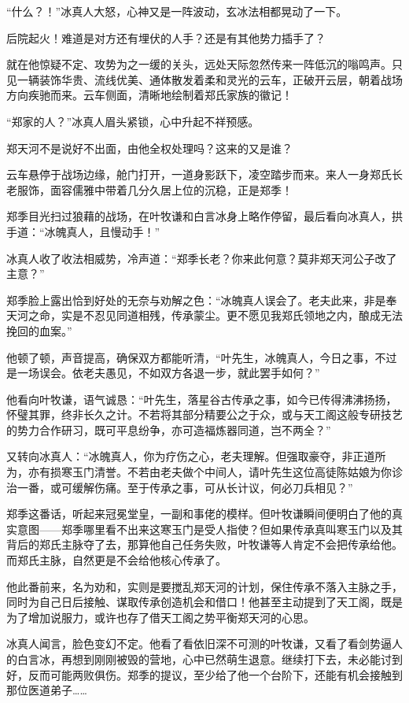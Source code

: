 “什么？！”冰真人大怒，心神又是一阵波动，玄冰法相都晃动了一下。

后院起火！难道是对方还有埋伏的人手？还是有其他势力插手了？

就在他惊疑不定、攻势为之一缓的关头，远处天际忽然传来一阵低沉的嗡鸣声。只见一辆装饰华贵、流线优美、通体散发着柔和灵光的云车，正破开云层，朝着战场方向疾驰而来。云车侧面，清晰地绘制着郑氏家族的徽记！

“郑家的人？”冰真人眉头紧锁，心中升起不祥预感。

郑天河不是说好不出面，由他全权处理吗？这来的又是谁？

云车悬停于战场边缘，舱门打开，一道身影跃下，凌空踏步而来。来人一身郑氏长老服饰，面容儒雅中带着几分久居上位的沉稳，正是郑季！

郑季目光扫过狼藉的战场，在叶牧谦和白言冰身上略作停留，最后看向冰真人，拱手道：“冰魄真人，且慢动手！”

冰真人收了收法相威势，冷声道：“郑季长老？你来此何意？莫非郑天河公子改了主意？”

郑季脸上露出恰到好处的无奈与劝解之色：“冰魄真人误会了。老夫此来，非是奉天河之命，实是不忍见同道相残，传承蒙尘。更不愿见我郑氏领地之内，酿成无法挽回的血案。”

他顿了顿，声音提高，确保双方都能听清，“叶先生，冰魄真人，今日之事，不过是一场误会。依老夫愚见，不如双方各退一步，就此罢手如何？”

他看向叶牧谦，语气诚恳：“叶先生，落星谷古传承之事，如今已传得沸沸扬扬，怀璧其罪，终非长久之计。不若将其部分精要公之于众，或与天工阁这般专研技艺的势力合作研习，既可平息纷争，亦可造福炼器同道，岂不两全？”

又转向冰真人：“冰魄真人，你为疗伤之心，老夫理解。但强取豪夺，非正道所为，亦有损寒玉门清誉。不若由老夫做个中间人，请叶先生这位高徒陈姑娘为你诊治一番，或可缓解伤痛。至于传承之事，可从长计议，何必刀兵相见？”

郑季这番话，听起来冠冕堂皇，一副和事佬的模样。但叶牧谦瞬间便明白了他的真实意图——郑季哪里看不出来这寒玉门是受人指使？但如果传承真叫寒玉门以及其背后的郑氏主脉夺了去，那算他自己任务失败，叶牧谦等人肯定不会把传承给他。而郑氏主脉，自然更是不会给他核心传承了。

他此番前来，名为劝和，实则是要搅乱郑天河的计划，保住传承不落入主脉之手，同时为自己日后接触、谋取传承创造机会和借口！他甚至主动提到了天工阁，既是为了增加说服力，或许也存了借天工阁之势平衡郑天河的心思。

冰真人闻言，脸色变幻不定。他看了看依旧深不可测的叶牧谦，又看了看剑势逼人的白言冰，再想到刚刚被毁的营地，心中已然萌生退意。继续打下去，未必能讨到好，反而可能两败俱伤。郑季的提议，至少给了他一个台阶下，还能有机会接触到那位医道弟子……

